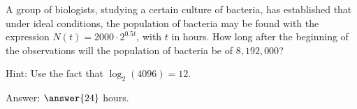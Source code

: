 \documentclass{ximera}
\author{Ivo Terek}
\begin{document}
\begin{exercise}

  A group of biologists, studying a certain culture of bacteria, has established that under ideal conditions, the population of bacteria may be found with the expression $N(t) = 2000\cdot 2^{0.5t}$, with $t$ in hours. How long after the beginning of the observations will the population of bacteria be of $8,192,000$?

Hint: Use the fact that $\log_{2}(4096)=12$.

  Answer: $\answer{24}$ hours.

\end{exercise}
\end{document}

